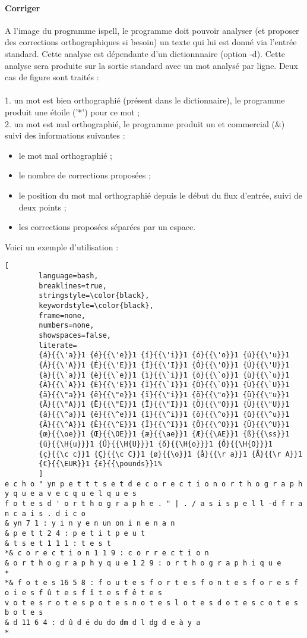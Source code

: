 \paragraph{Corriger}
A l'image du programme ispell, le programme doit pouvoir analyser (et proposer des corrections orthographiques si besoin) un texte qui lui est donné via l'entrée standard. Cette analyse est dépendante d'un dictionnnaire (option -d). Cette analyse sera produite sur la sortie standard avec un mot analysé par ligne. Deux cas de figure sont traités :\\
\\
1. un mot est bien orthographié (présent dans le dictionnaire), le programme produit une étoile ('*')
pour ce mot ;\\
2. un mot est mal orthographié, le programme produit un et commercial (\&) suivi des informations suivantes :
\begin{itemize}
	\item le mot mal orthographié ;
	\item le nombre de corrections proposées ;
	\item le position du mot mal orthographié depuis le début du flux d'entrée, suivi de deux points ;
	\item les corrections proposées séparées par un espace.
\end{itemize}
Voici un exemple d'utilisation :
\begin{lstlisting}[
		language=bash,
		breaklines=true,
		stringstyle=\color{black},
		keywordstyle=\color{black},
		frame=none,
		numbers=none,
		showspaces=false,
		literate=
		{á}{{\'a}}1 {é}{{\'e}}1 {í}{{\'i}}1 {ó}{{\'o}}1 {ú}{{\'u}}1
		{Á}{{\'A}}1 {É}{{\'E}}1 {Í}{{\'I}}1 {Ó}{{\'O}}1 {Ú}{{\'U}}1
		{à}{{\`a}}1 {è}{{\`e}}1 {ì}{{\`i}}1 {ò}{{\`o}}1 {ù}{{\`u}}1
		{À}{{\`A}}1 {È}{{\'E}}1 {Ì}{{\`I}}1 {Ò}{{\`O}}1 {Ù}{{\`U}}1
		{ä}{{\"a}}1 {ë}{{\"e}}1 {ï}{{\"i}}1 {ö}{{\"o}}1 {ü}{{\"u}}1
		{Ä}{{\"A}}1 {Ë}{{\"E}}1 {Ï}{{\"I}}1 {Ö}{{\"O}}1 {Ü}{{\"U}}1
		{â}{{\^a}}1 {ê}{{\^e}}1 {î}{{\^i}}1 {ô}{{\^o}}1 {û}{{\^u}}1
		{Â}{{\^A}}1 {Ê}{{\^E}}1 {Î}{{\^I}}1 {Ô}{{\^O}}1 {Û}{{\^U}}1
		{œ}{{\oe}}1 {Œ}{{\OE}}1 {æ}{{\ae}}1 {Æ}{{\AE}}1 {ß}{{\ss}}1
		{ű}{{\H{u}}}1 {Ű}{{\H{U}}}1 {ő}{{\H{o}}}1 {Ő}{{\H{O}}}1
		{ç}{{\c c}}1 {Ç}{{\c C}}1 {ø}{{\o}}1 {å}{{\r a}}1 {Å}{{\r A}}1
		{€}{{\EUR}}1 {£}{{\pounds}}1%
		]
e c h o " yn p e t t t s e t d e c o r e c t i o n o r t h o g r a p h y q u e a v e c q u e l q u e s
f o t e s d ' o r t h o g r a p h e . " | . / a s i s p e l l -d f r a n c a i s . d i c o
& yn 7 1 : y i n y e n un on i n e n a n
& p e t t 2 4 : p e t i t p e u t
& t s e t 1 1 1 : t e s t
*& c o r e c t i o n 1 1 9 : c o r r e c t i o n
& o r t h o g r a p h y q u e 1 2 9 : o r t h o g r a p h i q u e
*
*& f o t e s 16 5 8 : f o u t e s f o r t e s f o n t e s f o r e s f o i e s f û t e s f î t e s f ê t e s
v o t e s r o t e s p o t e s n o t e s l o t e s d o t e s c o t e s b o t e s
& d 11 6 4 : d û d é du do dm d l dg d e à y a
*
\end{lstlisting}

